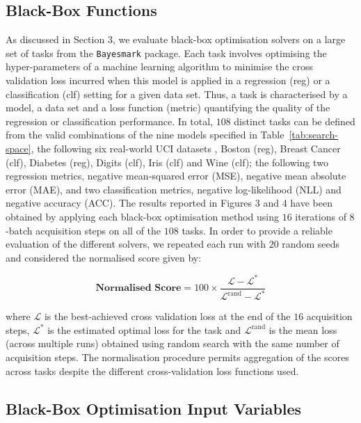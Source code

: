 \documentclass[jair,twoside,11pt,theapa]{article}
\let\cite\shortcite
\theoremstyle{definition}
\begin{document}
\subsection{Black-Box Functions} 
As discussed in Section 3, we evaluate black-box optimisation solvers on a large set of tasks from the \texttt{Bayesmark} package. Each task involves optimising the hyper-parameters of a machine learning algorithm to minimise the cross validation loss incurred when this model is applied in a regression (reg) or a classification (clf) setting for a given data set. 
 Thus, a task is characterised by a model, a data set and a loss function (metric) quantifying the quality of the regression or classification performance. In total, $108$ distinct tasks can be defined from the valid combinations of the nine models specified in Table~\ref{tab:search-space}, the following six real-world UCI datasets \cite{2019_Dua}, Boston (reg), Breast Cancer (clf), Diabetes (reg), Digits (clf), Iris (clf) and Wine (clf); the following two regression metrics, negative mean-squared error (MSE), negative mean absolute error (MAE), and two classification metrics, negative log-likelihood (NLL) and negative accuracy (ACC).
 The results reported in Figures 3 and 4 have been obtained by applying each black-box optimisation method using $16$ iterations of $8$-batch acquisition steps on all of the $108$ tasks. In order to provide a reliable evaluation of the different solvers, we repeated each run with $20$ random seeds and considered the normalised score given by:
 
    \begin{equation}
    \label{eq:score}
        \textbf{Normalised Score} = 100 \times \frac{\mathcal{L} - \mathcal{L}^*}{\mathcal{L}^{\text{rand}} - \mathcal{L}^*}
    \end{equation}
    
where $\mathcal{L}$ is the best-achieved cross validation loss at the end of the $16$ acquisition steps, $\mathcal{L}^*$ is the estimated optimal loss for the task and $\mathcal{L}^{\text{rand}}$ is the mean loss (across multiple runs) obtained using random search with the same number of acquisition steps. The normalisation procedure permits aggregation of the scores across tasks despite the different cross-validation loss functions used. 


    
\subsection{Black-Box Optimisation Input Variables} 
\end{document}
